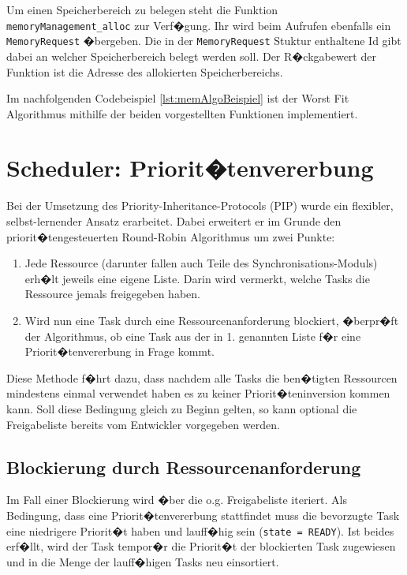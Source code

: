 Um einen Speicherbereich zu belegen steht die Funktion \texttt{memoryManagement\_alloc} zur Verf�gung.
Ihr wird beim Aufrufen ebenfalls ein \texttt{MemoryRequest} �bergeben.
Die in der \texttt{MemoryRequest} Stuktur enthaltene Id gibt dabei an welcher Speicherbereich belegt werden soll.
Der R�ckgabewert der Funktion ist die Adresse des allokierten Speicherbereichs.

Im nachfolgenden Codebeispiel \ref{lst:memAlgoBeispiel} ist der Worst Fit Algorithmus mithilfe der beiden vorgestellten Funktionen implementiert.



\section{Scheduler: Priorit�tenvererbung}
\label{sect:pip}
Bei der Umsetzung des Priority-Inheritance-Protocols (PIP) wurde 
ein flexibler, selbst-lernender Ansatz erarbeitet. Dabei erweitert
er im Grunde den priorit�tengesteuerten Round-Robin Algorithmus
um zwei Punkte:

\begin{enumerate}
\item Jede Ressource (darunter fallen auch Teile des 
Synchronisations-Moduls) erh�lt jeweils eine eigene Liste.
Darin wird vermerkt, welche Tasks die Ressource jemals freigegeben
haben.
\item Wird nun eine Task durch eine Ressourcenanforderung 
blockiert, �berpr�ft der Algorithmus, ob eine Task aus der
in 1. genannten Liste f�r eine Priorit�tenvererbung in Frage
kommt.
\end{enumerate}

Diese Methode f�hrt dazu, dass nachdem alle Tasks die ben�tigten
Ressourcen mindestens einmal verwendet haben es zu keiner
Priorit�teninversion kommen kann. Soll diese Bedingung gleich
zu Beginn gelten, so kann optional die Freigabeliste bereits
vom Entwickler vorgegeben werden.

\subsection{Blockierung durch Ressourcenanforderung}
Im Fall einer Blockierung wird �ber die o.g. Freigabeliste 
iteriert. Als Bedingung, dass eine Priorit�tenvererbung stattfindet
muss die bevorzugte Task eine niedrigere Priorit�t haben und
lauff�hig sein (\texttt{state = READY}). Ist beides erf�llt,
wird der Task tempor�r die Priorit�t der blockierten Task 
zugewiesen und in die Menge der lauff�higen Tasks neu einsortiert.

